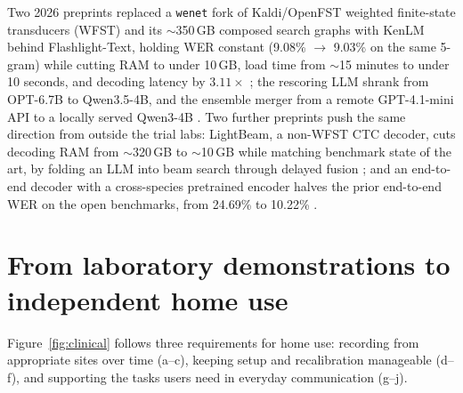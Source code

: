 \documentclass[11pt]{article}
\begin{document}
Two 2026 preprints replaced a \texttt{wenet} fork of Kaldi/OpenFST
weighted finite-state transducers (WFST) and its $\sim$350\,GB
composed search graphs with KenLM \cite{heafield2011} behind Flashlight-Text, holding
WER constant (9.08\% $\to$ 9.03\% on the same 5-gram) while cutting RAM
to under 10\,GB, load time from $\sim$15 minutes to under 10 seconds,
and decoding latency by $3.11\times$ \cite{fogg2026, yoon2026}; the
rescoring LLM shrank from OPT-6.7B \cite{opt} to Qwen3.5-4B, and the
ensemble merger from a remote GPT-4.1-mini API to a locally served
Qwen3-4B \cite{fogg2026, yoon2026}. Two further preprints push the same
direction from outside the trial labs: LightBeam, a non-WFST CTC
decoder, cuts decoding RAM from $\sim$320\,GB to $\sim$10\,GB while
matching benchmark state of the art, by folding an LLM into beam search
through delayed fusion \cite{feghhi2026}; and an end-to-end decoder
with a cross-species pretrained encoder halves the prior end-to-end
WER on the open benchmarks, from 24.69\% to 10.22\% \cite{bit2026}.

\section{From laboratory demonstrations to independent home use}
\label{sec:maturity}

Figure~\ref{fig:clinical} follows three requirements for home use:
recording from appropriate sites over time (a--c), keeping setup and
recalibration manageable (d--f), and supporting the tasks users need
in everyday communication (g--j).
\end{document}
